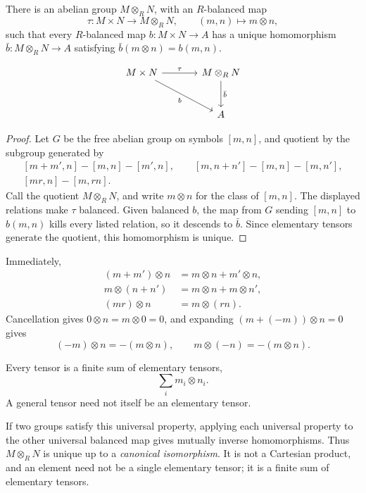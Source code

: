 \begin{theorem}\label{thm:binary-tensor}
There is an abelian group \(M\otimes_RN\), with an \(R\)-balanced map
\[
\tau:M\times N\longrightarrow M\otimes_RN,
\qquad (m,n)\longmapsto m\otimes n,
\]
such that every \(R\)-balanced map \(b:M\times N\to A\) has a unique
homomorphism \(\bar b:M\otimes_RN\to A\) satisfying
\(\bar b(m\otimes n)=b(m,n)\).
\end{theorem}
\[
\begin{tikzcd}[column sep=large, row sep=large]
M\times N \arrow[r, "\tau"] \arrow[dr, "b"'] &
M\otimes_R N \arrow[d, "\bar b"] \\
& A
\end{tikzcd}
\]
\begin{proof}
Let \(G\) be the free abelian group on symbols \([m,n]\), and quotient by
the subgroup generated by
\[
\begin{aligned}
[m+m',n]-[m,n]-[m',n],\qquad
[m,n+n']-[m,n]-[m,n'],\\
[mr,n]-[m,rn].
\end{aligned}
\]
Call the quotient \(M\otimes_RN\), and write \(m\otimes n\) for the class of
\([m,n]\). The displayed relations make \(\tau\) balanced. Given balanced
\(b\), the map from \(G\) sending \([m,n]\) to \(b(m,n)\) kills every
listed relation, so it descends to \(\bar b\). Since elementary tensors generate
the quotient, this homomorphism is unique.
\end{proof}

Immediately,
\[
\begin{aligned}
(m+m')\otimes n&=m\otimes n+m'\otimes n,\\
m\otimes(n+n')&=m\otimes n+m\otimes n',\\
(mr)\otimes n&=m\otimes(rn).
\end{aligned}
\]
Cancellation gives \(0\otimes n=m\otimes0=0\), and expanding
\((m+(-m))\otimes n=0\) gives
\[
(-m)\otimes n=-(m\otimes n),\qquad
m\otimes(-n)=-(m\otimes n).
\]
\begin{remark}
Every tensor is a finite sum of elementary tensors,
\[
\sum_i m_i\otimes n_i.
\]
A general tensor need not itself be an elementary tensor.
\end{remark}

If two groups satisfy this universal property, applying each universal
property to the other universal balanced map gives mutually inverse
homomorphisms. Thus \(M\otimes_RN\) is unique up to a \emph{canonical
isomorphism}. It is not a Cartesian product, and an element need not be a
single elementary tensor; it is a finite sum of elementary tensors.

